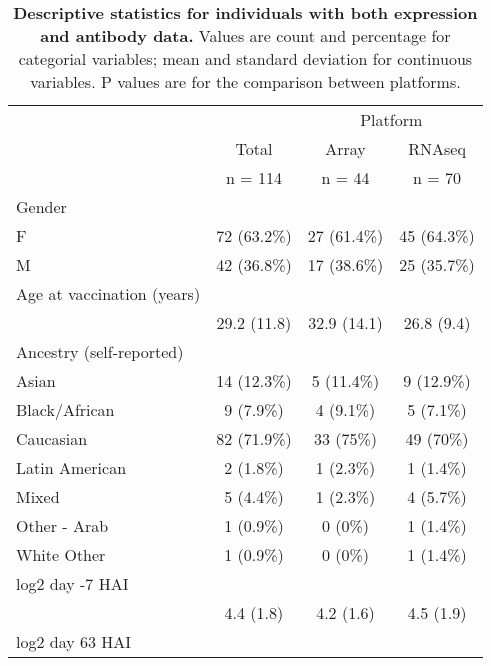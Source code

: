 \begin{table}[] 
 \centering 
 \caption{\textbf{Descriptive statistics for individuals with both expression and antibody data.} Values are count and percentage for categorial variables; mean and standard deviation for continuous variables. P values are for the comparison between platforms.}\label{tab:hird_table1}
 \begin{tabular}{ l c c c }
 \toprule
  &   &  \multicolumn{ 2 }{c}{ Platform }\\ 
  & Total & Array & \gls{RNAseq} \\ 
  & n = 114 & n = 44 & n = 70 \\ 
  \midrule
 Gender &   &   &  \\ 
 \hspace{6pt}    F & 72 (63.2\%) & 27 (61.4\%) & 45 (64.3\%)\\ 
 \hspace{6pt}    M & 42 (36.8\%) & 17 (38.6\%) & 25 (35.7\%)\\ 
 Age at vaccination (years)  &   &   &  \\ 
 \hspace{6pt}   & 29.2 (11.8) & 32.9 (14.1) & 26.8 (9.4)\\ 
 Ancestry (self-reported) &   &   &  \\ 
 \hspace{6pt}    Asian & 14 (12.3\%) & 5 (11.4\%) & 9 (12.9\%)\\ 
 \hspace{6pt}    Black/African & 9 (7.9\%) & 4 (9.1\%) & 5 (7.1\%)\\ 
 \hspace{6pt}    Caucasian & 82 (71.9\%) & 33 (75\%) & 49 (70\%)\\ 
 \hspace{6pt}    Latin American & 2 (1.8\%) & 1 (2.3\%) & 1 (1.4\%)\\ 
 \hspace{6pt}    Mixed & 5 (4.4\%) & 1 (2.3\%) & 4 (5.7\%)\\ 
 \hspace{6pt}    Other - Arab & 1 (0.9\%) & 0 (0\%) & 1 (1.4\%)\\ 
 \hspace{6pt}    White Other & 1 (0.9\%) & 0 (0\%) & 1 (1.4\%)\\ 
 log2 day -7 HAI  &   &   &  \\ 
 \hspace{6pt}   & 4.4 (1.8) & 4.2 (1.6) & 4.5 (1.9)\\ 
 log2 day 63 HAI  &   &   &  \\ 

\end{tabular}
\end{table}

